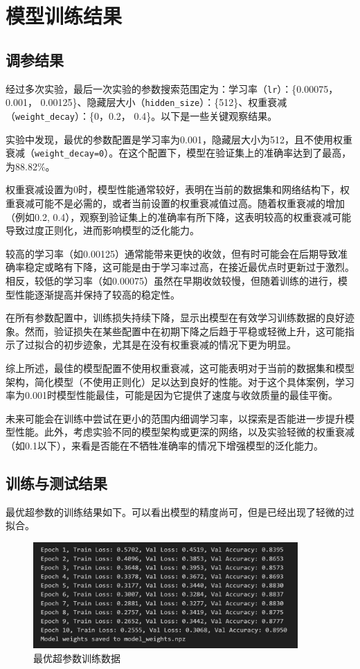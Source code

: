 \documentclass[a4paper,12pt]{article}
\begin{document}
\section{模型训练结果}
\subsection{调参结果}

经过多次实验，最后一次实验的参数搜索范围定为：学习率（\texttt{lr}）：\{0.00075，0.001， 0.00125\}、隐藏层大小（\texttt{hidden\_size}）：\{512\}、权重衰减（\texttt{weight\_decay}）：\{0，0.2， 0.4\}。以下是一些关键观察结果。

实验中发现，最优的参数配置是学习率为0.001，隐藏层大小为512，且不使用权重衰减（\texttt{weight\_decay=0}）。在这个配置下，模型在验证集上的准确率达到了最高，为88.82\%。

权重衰减设置为0时，模型性能通常较好，表明在当前的数据集和网络结构下，权重衰减可能不是必需的，或者当前设置的权重衰减值过高。随着权重衰减的增加（例如0.2, 0.4），观察到验证集上的准确率有所下降，这表明较高的权重衰减可能导致过度正则化，进而影响模型的泛化能力。

较高的学习率（如0.00125）通常能带来更快的收敛，但有时可能会在后期导致准确率稳定或略有下降，这可能是由于学习率过高，在接近最优点时更新过于激烈。相反，较低的学习率（如0.00075）虽然在早期收敛较慢，但随着训练的进行，模型性能逐渐提高并保持了较高的稳定性。

在所有参数配置中，训练损失持续下降，显示出模型在有效学习训练数据的良好迹象。然而，验证损失在某些配置中在初期下降之后趋于平稳或轻微上升，这可能指示了过拟合的初步迹象，尤其是在没有权重衰减的情况下更为明显。

综上所述，最佳的模型配置不使用权重衰减，这可能表明对于当前的数据集和模型架构，简化模型（不使用正则化）足以达到良好的性能。对于这个具体案例，学习率为0.001时模型性能最佳，可能是因为它提供了速度与收敛质量的最佳平衡。

未来可能会在训练中尝试在更小的范围内细调学习率，以探索是否能进一步提升模型性能。此外，考虑实验不同的模型架构或更深的网络，以及实验轻微的权重衰减（如0.1以下），来看是否能在不牺牲准确率的情况下增强模型的泛化能力。


\subsection{训练与测试结果}
最优超参数的训练结果如下。可以看出模型的精度尚可，但是已经出现了轻微的过拟合。

\begin{figure}[H]
    \centering
    \includegraphics[width=0.9\textwidth]{train_stat.png}
    \caption{最优超参数训练数据}
    \label{fig:example}
\end{figure}
\end{document}
